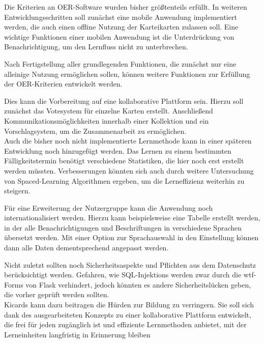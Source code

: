 Die Kriterien an OER-Software wurden bisher größtenteils erfüllt. In weiteren Entwicklungsschritten soll zunächst eine mobile Anwendung implementiert werden, die auch einen offline Nutzung der Karteikarten zulassen soll. Eine wichtige Funktionen einer mobilen Anwendung ist die Unterdrückung von Benachrichtigung, um den Lernfluss nicht zu unterbrechen.

Nach Fertigstellung aller grundlegenden Funktionen, die zunächst nur eine alleinige Nutzung ermöglichen sollen, können weitere Funktionen zur Erfüllung der OER-Kriterien entwickelt werden. 

Dies kann die Vorbereitung auf eine kollaborative Plattform sein. Hierzu soll zunächst das Votesystem für einzelne Karten erstellt. Anschließend Kommunikationsmöglichkeiten innerhalb einer Kollektion und ein Vorschlagsystem, um die Zusammenarbeit zu ermöglichen.\\

Auch die bisher noch nicht implementierte Lernmethode kann in einer späteren Entwicklung noch hinzugefügt werden. Das Lernen zu einem bestimmten Fälligkeitstermin benötigt verschiedene Statistiken, die hier noch erst erstellt werden müssten. Verbesserungen könnten sich auch durch weitere Untersuchung von Spaced-Learning Algorithmen ergeben, um die Lerneffizienz weiterhin zu steigern.

Für eine Erweiterung der Nutzergruppe kann die Anwendung noch internationalisiert werden. Hierzu kann beispielsweise eine Tabelle erstellt werden, in der alle Benachrichtigungen und  Beschriftungen in verschiedene Sprachen übersetzt werden. Mit einer Option zur Sprachauswahl in den Einstellung können dann alle Daten dementsprechend angepasst werden.

Nicht zuletzt sollten noch Sicherheitsaspekte und Pflichten aus dem Datenschutz berücksichtigt werden. Gefahren, wie SQL-Injektions werden zwar durch die wtf-Forms von Flask verhindert, jedoch könnten es andere Sicherheitslücken geben, die vorher geprüft werden sollten. \\

Kicards kann dazu beitragen die Hürden zur Bildung zu verringern. Sie soll sich dank des ausgearbeiteten Konzepts zu einer kollaborative Plattform entwickelt, die frei für jeden zugänglich ist und effiziente Lernmethoden anbietet, mit der Lerneinheiten langfristig in Erinnerung bleiben

